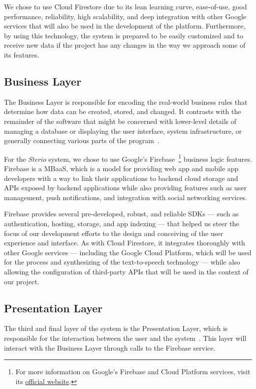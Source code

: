 We chose to use Cloud Firestore due to its lean learning curve, ease-of-use, good performance, reliability, high scalability, and deep integration with other Google services that will also be used in the development of the platform. Furthermore, by using this technology, the system is prepared to be easily customized and to receive new data if the project has any changes in the way we approach some of its features.


\subsection{Business Layer}

The Business Layer is responsible for encoding the real-world business rules that determine how data can be created, stored, and changed. It contrasts with the remainder of the software that might be concerned with lower-level details of managing a database or displaying the user interface, system infrastructure, or generally connecting various parts of the program~\cite{Aarsten}. 

For the \textit{Sterio} system, we chose to use Google's Firebase~\footnote{For more information on Google's Firebase and Cloud Platform services, visit its \href{https://firebase.google.com/}{official website}.} business logic features. Firebase is a \ac{MBaaS}, which is a model for providing web app and mobile app developers with a way to link their applications to backend cloud storage and \acp{API} exposed by backend applications while also providing features such as user management, push notifications, and integration with social networking services.

Firebase provides several pre-developed, robust, and reliable \acp{SDK} — such as authentication, hosting, storage, and app indexing — that helped us steer the focus of our development efforts to the design and conceiving of the user experience and interface. As with Cloud Firestore, it integrates thoroughly with other Google services — including the Google Cloud Platform, which will be used for the process and synthesizing of the text-to-speech technology — while also allowing the configuration of third-party \acp{API} that will be used in the context of our project.

\subsection{Presentation Layer}

The third and final layer of the system is the Presentation Layer, which is responsible for the interaction between the user and the system~\cite{Aarsten}. This layer will interact with the Business Layer through calls to the Firebase service.

